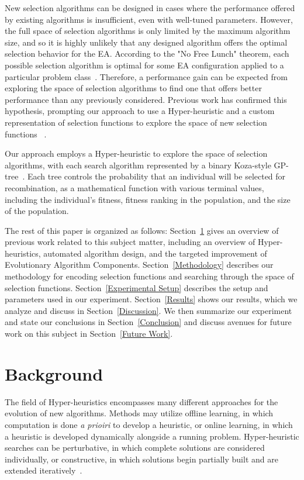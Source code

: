 \documentclass[sigconf]{acmart}
\begin{document}
New selection algorithms can be designed in cases where the performance offered by existing algorithms is insufficient, even with well-tuned parameters. However, the full space of selection algorithms is only limited by the maximum algorithm size, and so it is highly unlikely that any designed algorithm offers the optimal selection behavior for the EA. According to the "No Free Lunch" theorem, each possible selection algorithm is optimal for some EA configuration applied to a particular problem class~\cite{wolpert1995noFreeLunch}. Therefore, a performance gain can be expected from exploring the space of selection algorithms to find one that offers better performance than any previously considered. Previous work has confirmed this hypothesis, prompting our approach to use a Hyper-heuristic and a custom representation of selection functions to explore the space of new selection functions ~\cite{woodward2011selection}.

Our approach employs a Hyper-heuristic to explore the space of selection algorithms, with each search algorithm represented by a binary Koza-style GP-tree~\cite{koza1994genetic}. Each tree controls the probability that an individual will be selected for recombination, as a mathematical function with various terminal values, including the individual's fitness, fitness ranking in the population, and the size of the population.

The rest of this paper is organized as follows: Section~\ref{Background} gives an overview of previous work related to this subject matter, including an overview of Hyper-heuristics, automated algorithm design, and the targeted improvement of Evolutionary Algorithm Components. Section~\ref{Methodology} describes our methodology for encoding selection functions and searching through the space of selection functions. Section~\ref{Experimental Setup} describes the setup and parameters used in our experiment. Section~\ref{Results} shows our results, which we analyze and discuss in Section~\ref{Discussion}. We then summarize our experiment and state our conclusions in Section~\ref{Conclusion} and discuss avenues for future work on this subject in Section~\ref{Future Work}.

\section{Background}
\label{Background}
The field of Hyper-heuristics encompasses many different approaches for the evolution of new algorithms. Methods may utilize offline learning, in which computation is done \textit{a prioiri} to develop a heuristic, or online learning, in which a heuristic is developed dynamically alongside a running problem. Hyper-heuristic searches can be perturbative, in which complete solutions are considered individually, or constructive, in which solutions begin partially built and are extended iteratively~\cite{burke2013HHstateoftheart}.
\end{document}
